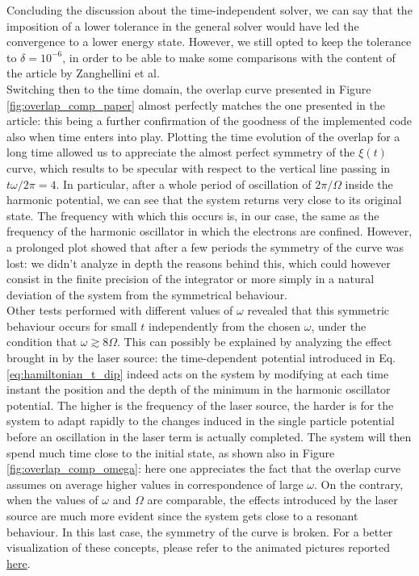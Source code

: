 Concluding the discussion about the time-independent solver, we can say that the imposition of a lower tolerance in the general solver would have led the convergence to a lower energy state. However, we still opted to keep the tolerance to $\delta=10^{-6}$, in order to be able to make some comparisons with the content of the article by Zanghellini et al. \\


Switching then to the time domain, the overlap curve presented in Figure \ref{fig:overlap_comp_paper} almost perfectly matches the one presented in the article: this being a further confirmation of the goodness of the implemented code also when time enters into play. Plotting the time evolution of the overlap for a long time allowed us to appreciate the almost perfect symmetry of the $\xi(t)$ curve, which results to be specular with respect to the vertical line passing in $t\omega/2\pi=4$. In particular, after a whole period of oscillation of $2\pi/\Omega$ inside the harmonic potential, we can see that the system returns very close to its original state. The frequency with which this occurs is, in our case, the same as the frequency of the harmonic oscillator in which the electrons are confined. However, a prolonged plot showed that after a few periods the symmetry of the curve was lost: we didn't analyze in depth the reasons behind this, which could however consist in the finite precision of the integrator or more simply in a natural deviation of the system from the symmetrical behaviour. \\ 

Other tests performed with different values of $\omega$ revealed that this symmetric behaviour occurs for small $t$ independently from the chosen $\omega$, under the condition that $\omega \gtrsim 8\Omega$. This can possibly be explained by analyzing the effect brought in by the laser source: the time-dependent potential introduced in Eq.\,\ref{eq:hamiltonian_t_dip} indeed acts on the system by modifying at each time instant the position and the depth of the minimum in the harmonic oscillator potential. The higher is the frequency of the laser source, the harder is for the system to adapt rapidly to the changes induced in the single particle potential before an oscillation in the laser term is actually completed. The system will then spend much time close to the initial state, as shown also in Figure \ref{fig:overlap_comp_omega}: here one appreciates the fact that the overlap curve assumes on average higher values in correspondence of large $\omega$.  On the contrary, when the values of $\omega$ and $\Omega$ are comparable, the effects introduced by the laser source are much more evident since the system gets close to a resonant behaviour. In this last case, the symmetry of the curve is broken. For a better visualization of these concepts, please refer to the animated pictures reported \href{https://github.com/Matteo294/FYS4411/tree/main/Project2/code}{here}.

